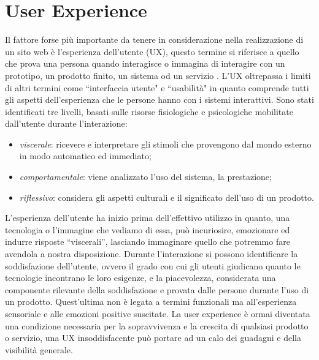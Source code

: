 \documentclass[target=bach,aauheader=]{thud}
\begin{document}
\section{User Experience}
Il fattore forse più importante da tenere in considerazione nella realizzazione di un sito web è l'esperienza dell'utente (UX), questo termine si riferisce a quello che prova una persona quando interagisce o immagina di interagire con un prototipo, un prodotto finito, un sistema od un servizio \cite{hassenzahl2006user}.
L'UX oltrepassa i limiti di altri termini come ``interfaccia utente" e ``usabilità" in quanto comprende tutti gli aspetti dell'esperienza che le persone hanno con i sistemi interattivi.
\newline 
Sono stati identificati tre livelli, basati sulle risorse fisiologiche e psicologiche mobilitate dall'utente durante l'interazione:
\begin{itemize}
    \item \textit{viscerale}: ricevere e interpretare gli stimoli che provengono dal mondo esterno in modo automatico ed immediato;
    \item \textit{comportamentale}: viene analizzato l'uso del sistema, la prestazione;
    \item \textit{riflessivo}: considera gli aspetti culturali e il significato dell'uso di un prodotto.
\end{itemize}
L'esperienza dell'utente ha inizio prima dell'effettivo utilizzo in quanto, una tecnologia o l'immagine che vediamo di essa, può incuriosire, emozionare ed indurre risposte “viscerali”, lasciando immaginare quello che potremmo fare avendola a nostra disposizione.
Durante l'interazione si possono identificare la soddisfazione dell'utente, ovvero il grado con cui gli utenti giudicano quanto le tecnologie incontrano le loro esigenze, e la piacevolezza, considerata una componente rilevante della soddisfazione e provata dalle persone durante l'uso di un prodotto.
Quest'ultima non è legata a termini funzionali ma all'esperienza sensoriale e alle emozioni positive suscitate. 
\newline
La user experience è ormai diventata una condizione necessaria per la sopravvivenza e la crescita di qualsiasi prodotto o servizio, una UX insoddisfacente può portare ad un calo dei guadagni e della visibilità generale.

\end{document}
